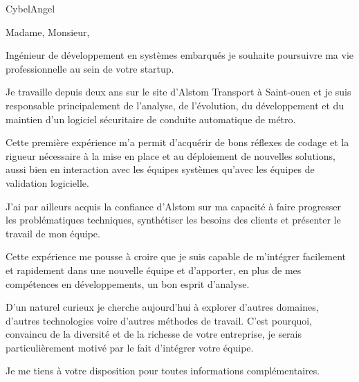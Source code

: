 \documentclass[11pt]{lettre}
\makeatletter
\newcommand*{\NoRule}{\renewcommand*{\rule@length}{0}}
\makeatother
\begin{document}
\begin{letter}{CybelAngel}

  \signature{Hoel IRIS}
  \address{Hoel IRIS\\
  54 avenue Mathurin Moreau\\
  75019 Paris\\
  Tel : 06 18 39 30 11\\
  E-Mail : hoel.iris@gmail.com}
  \NoRule
  \notelephone
  \nofax
    \opening{Madame, Monsieur,}
    
    Ingénieur de développement en systèmes embarqués je souhaite poursuivre ma vie professionnelle au sein de votre startup.
    
    Je travaille depuis deux ans sur le site d'Alstom Transport à Saint-ouen et je suis responsable principalement de l'analyse, de l'évolution, du développement et du maintien d'un logiciel sécuritaire de conduite automatique de métro.
    
    Cette première expérience m'a permit d'acquérir de bons réflexes de codage et la rigueur nécessaire à la mise en place et au déploiement de nouvelles solutions, aussi bien en interaction avec les équipes systèmes qu'avec les équipes de validation logicielle.
    
    J'ai par ailleurs acquis la confiance d'Alstom sur ma capacité à faire progresser les problématiques techniques, synthétiser les besoins des clients et présenter le travail de mon équipe.
    
    Cette expérience me pousse à croire que je suis capable de m'intégrer facilement et rapidement dans une nouvelle équipe et d'apporter, en plus de mes compétences en développements, un bon esprit d'analyse.
    
    D'un naturel curieux je cherche aujourd'hui à explorer d'autres domaines, d'autres technologies voire d'autres méthodes de travail. C'est pourquoi, convaincu de la diversité et de la richesse de votre entreprise, je serais particulièrement motivé par le fait d’intégrer votre équipe.
    
    Je me tiens à votre disposition pour toutes informations complémentaires.
 
 
 
 
 


\end{letter}
\end{document}
